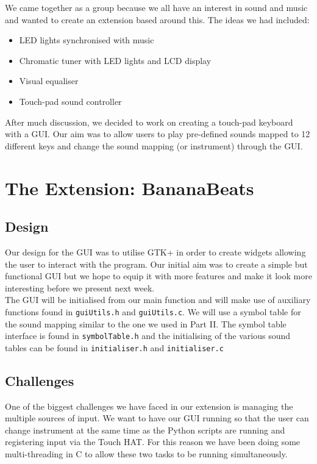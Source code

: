 \documentclass[11pt]{article}
\begin{document}
We came together as a group because we all have an interest in sound and music and wanted to create an extension based around this. The ideas we had included:
\begin{itemize}
\item LED lights synchronised with music
\item Chromatic tuner with LED lights and LCD display
\item Visual equaliser 
\item Touch-pad sound controller 
\end{itemize}
After much discussion, we decided to work on creating a touch-pad keyboard with a GUI. Our aim was to allow users to play pre-defined sounds mapped to 12 different keys and change the sound mapping (or instrument) through the GUI.

\section{The Extension: BananaBeats}

\subsection{Design}
	Our design for the GUI was to utilise GTK+ in order to create widgets allowing the user to interact with the program. Our initial aim was to create a simple but functional GUI but we hope to equip it with more features and make it look more interesting before we present next week. 
	\\
	
	The GUI will be initialised from our main function and will make use of auxiliary functions found in \texttt{guiUtils.h} and \texttt{guiUtils.c}. We will use a symbol table for the sound mapping similar to the one we used in Part II. The symbol table interface is found in \texttt{symbolTable.h} and the initialising of the various sound tables can be found in \texttt{initialiser.h} and \texttt{initialiser.c}

\subsection{Challenges}
	One of the biggest challenges we have faced in our extension is managing the multiple sources of input. We want to have our GUI running so that the user can change instrument at the same time as the Python scripts are running and registering input via the Touch HAT. For this reason we have been doing some multi-threading in C to allow these two tasks to be running simultaneously.\\
	
\end{document}
